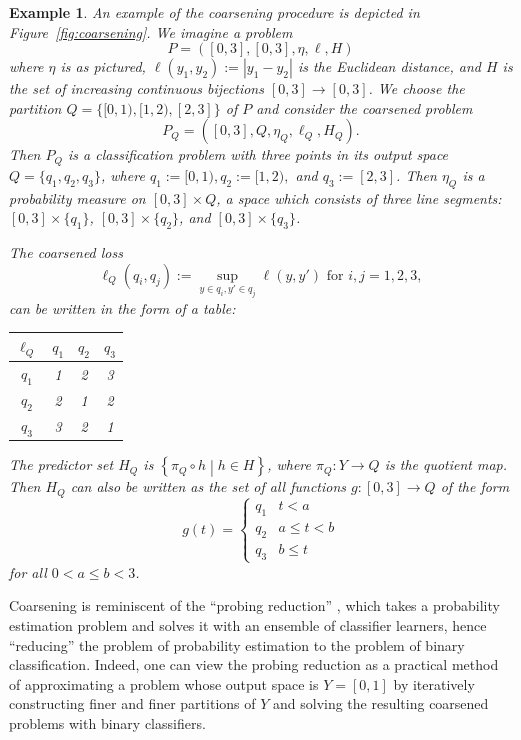 \documentclass[twoside,11pt]{article}
\newtheorem{examples}[theorem]{Example}
\newcommand{\set}[2]{\left\{ #1\middle| #2\right\}}
\begin{document}
\begin{examples}\label{ex:coarsening}
    An example of the coarsening procedure is depicted in Figure~\ref{fig:coarsening}. We imagine a problem
    \[P = ([0,3], [0,3], \eta,\ell,H)\]
    where $\eta$ is as pictured, $\ell(y_1,y_2):=|y_1 - y_2|$ is the Euclidean distance, and $H$ is the set of increasing continuous bijections $[0,3] \to [0,3]$. We choose the partition $Q = \{[0,1), [1,2), [2,3]\}$ of $P$ and consider the coarsened problem
    \[P_Q = ([0,3], Q, \eta_Q, \ell_Q, H_Q).\]
    Then $P_Q$ is a classification problem with three points in its output space $Q = \{q_1,q_2,q_3\}$, where $q_1:=[0,1), q_2:=[1,2),$ and $q_3:=[2,3]$.
    Then $\eta_Q$ is a probability measure on $[0,3]\times Q$, a space which consists of three line segments: $[0,3]\times \{q_1\}$, $[0,3]\times \{q_2\}$, and $[0,3]\times \{q_3\}$. 
    
    The coarsened loss $$\ell_Q(q_i,q_j) := \sup_{y\in q_i, y'\in q_j} \ell(y,y') \,\,\mbox{for $i,j=1,2,3$},$$ can be written in the form of a table:
    \begin{center}
        \begin{tabular}{|c|c c c| } 
        \hline
        $\ell_Q$ & $q_1$ & $q_2$ & $q_3$ \\
        \hline
        $q_1$ & 1 & 2 & 3 \\ 
        $q_2$ & 2 & 1 & 2 \\ 
        $q_3$ & 3 & 2 & 1 \\ 
        \hline
        \end{tabular}
    \end{center}
    The predictor set $H_Q$ is $\set{\pi_Q \circ h}{h\in H}$, where $\pi_Q : Y\to Q$ is the quotient map. Then $H_Q$ can also be written as the set of all functions $g:[0,3] \to Q$ of the form
    \[g(t) = \begin{cases}
        q_1 & t < a\\
        q_2 & a \leq t < b \\
        q_3 & b \leq t
    \end{cases}\]
    for all $0<a \leq b <3$. 
\end{examples}
    
    Coarsening is reminiscent of the ``probing reduction'' \citep{langford_probing_2005}, which takes a probability estimation problem and solves it with an ensemble of classifier learners, hence ``reducing'' the problem of probability estimation to the problem of binary classification. Indeed, one can view the probing reduction as a practical method of approximating a problem whose output space is $Y=[0,1]$ by iteratively constructing finer and finer partitions of $Y$ and solving the resulting coarsened problems with binary classifiers.
\end{document}
